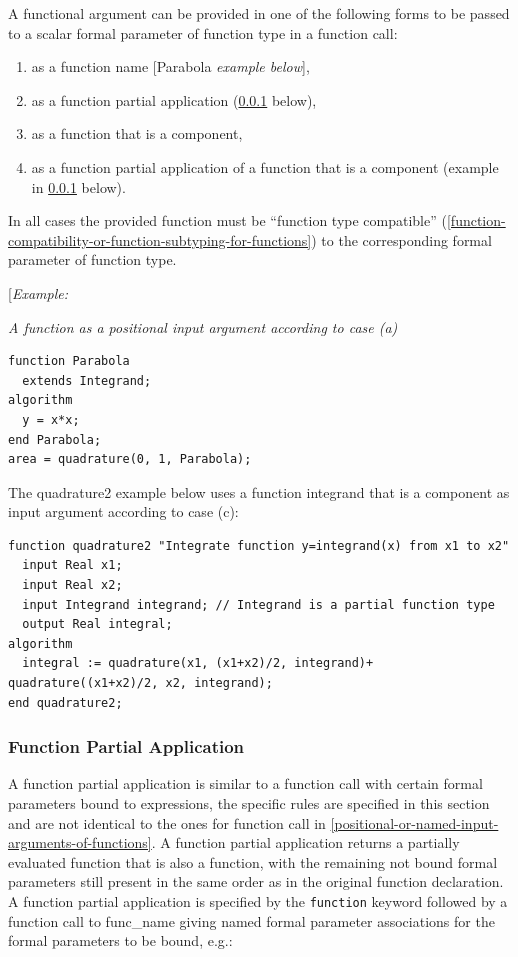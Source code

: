 \documentclass[10pt,a4paper]{report}
\def\doublelabel#1{\label{#1}}
\renewcommand{\labelenumi}{\arabic{enumi}.}
\begin{document}
A functional argument can be provided in one of the following forms to
be passed to a scalar formal parameter of function type in a function
call:

\begin{enumerate}
\def\labelenumi{\alph{enumi})}
\item
  as a function name {[}Parabola \emph{example below}{]},
\item
  as a function partial application (\ref{function-partial-application} below),
\item
  as a function that is a component,
\item
  as a function partial application of a function that is a component
  (example in \ref{function-partial-application} below).
\end{enumerate}

In all cases the provided function must be ``function type compatible''
(\ref{function-compatibility-or-function-subtyping-for-functions}) to the corresponding formal parameter of function type.

{[}\emph{Example:}

\emph{A function as a positional input argument according to case (a)}

\begin{lstlisting}[language=modelica]
function Parabola
  extends Integrand;
algorithm
  y = x*x;
end Parabola;
area = quadrature(0, 1, Parabola);
\end{lstlisting}
The quadrature2 example below uses a function integrand that is a
component as input argument according to case (c):

\begin{lstlisting}[language=modelica]
  function quadrature2 "Integrate function y=integrand(x) from x1 to x2"
  input Real x1;
  input Real x2;
  input Integrand integrand; // Integrand is a partial function type
  output Real integral;
algorithm
  integral := quadrature(x1, (x1+x2)/2, integrand)+  quadrature((x1+x2)/2, x2, integrand);
end quadrature2;
\end{lstlisting}
\subsubsection{Function Partial Application}\doublelabel{function-partial-application}

A function partial application is similar to a function call with
certain formal parameters bound to expressions, the specific rules are
specified in this section and are not identical to the ones for function
call in \ref{positional-or-named-input-arguments-of-functions}. A function partial application returns a partially
evaluated function that is also a function, with the remaining not bound
formal parameters still present in the same order as in the original
function declaration. A function partial application is specified by the
\lstinline!function! keyword followed by a function call to func\_name
giving named formal parameter associations for the formal parameters to
be bound, e.g.:
\end{document}

